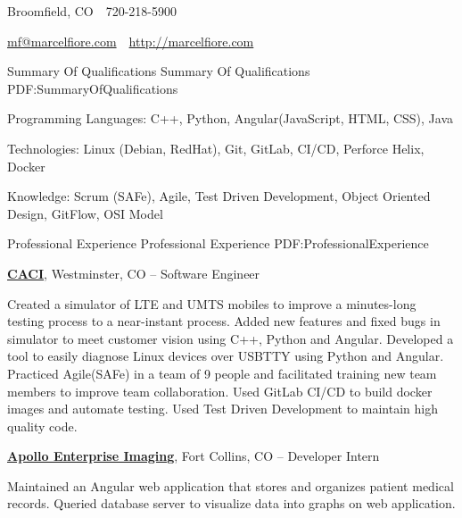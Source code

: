 \documentclass[letterpaper,MMMyyyy,nonstopmode]{simpleresumecv}
\newcommand{\CVAuthor}{Marcel Fiore}
\newcommand{\CVWebpage}{http://marcelfiore.com}
\begin{document}

\Title{\CVAuthor}

\begin{SubTitle}
Broomfield, CO
\,\SubBulletSymbol\,
720-218-5900
\par
\href{mailto:mf@marcelfiore.com}{mf@marcelfiore.com}
\,\SubBulletSymbol\,
\href{\CVWebpage}
{\url{\CVWebpage}}
\end{SubTitle}

\begin{Body}


\Section
{Summary Of Qualifications}
{Summary Of Qualifications}
{PDF:SummaryOfQualifications}

\BulletItem Programming Languages: C++, Python, Angular(JavaScript, HTML, CSS), Java

\Gap
\BulletItem Technologies: Linux (Debian, RedHat), Git, GitLab, CI/CD, Perforce Helix, Docker

\Gap
\BulletItem Knowledge: Scrum (SAFe), Agile, Test Driven Development, Object Oriented Design, GitFlow, OSI Model



\Section
{Professional Experience}
{Professional Experience}
{PDF:ProfessionalExperience}

\Entry
\href{https://www.caci.com/}{\textbf{CACI}},  Westminster, CO
\hfill
{} --
\BulletItem Software Engineer
\begin{Detail}
\SubBulletItem Created a simulator of LTE and UMTS mobiles to improve a minutes-long testing process to a near-instant process.
\SubBulletItem Added new features and fixed bugs in simulator to meet customer vision using C++, Python and Angular.
\SubBulletItem Developed a tool to easily diagnose Linux devices over USBTTY using Python and Angular.
\SubBulletItem Practiced Agile(SAFe) in a team of 9 people and facilitated training new team members to improve team collaboration.
\SubBulletItem Used GitLab CI/CD to build docker images and automate testing.
\SubBulletItem Used Test Driven Development to maintain high quality code.
\end{Detail}

\BigGap
\Entry
\href{https://apolloei.com/}{\textbf{Apollo Enterprise Imaging}},  Fort Collins, CO
\hfill
{} --
\BulletItem Developer Intern
\begin{Detail}
\SubBulletItem Maintained an Angular web application that stores and organizes patient medical records.
\SubBulletItem Queried database server to visualize data into graphs on web application.
\end{Detail}


\end{Body}
\end{document}
